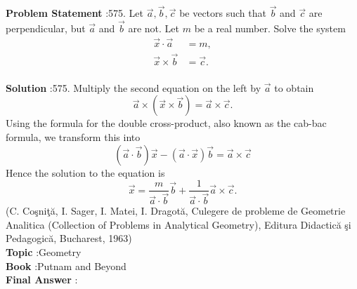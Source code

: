 \documentclass[10pt]{article}
\begin{document}
\textbf{Problem Statement} :575. Let $\vec{a}, \vec{b}, \vec{c}$ be vectors such that $\vec{b}$ and $\vec{c}$ are perpendicular, but $\vec{a}$ and $\vec{b}$ are not. Let $m$ be a real number. Solve the system$$ \begin{aligned} \vec{x} \cdot \vec{a} &=m, \\ \vec{x} \times \vec{b} &=\vec{c} . \end{aligned} $$\\
\textbf{Solution} :575. Multiply the second equation on the left by $\vec{a}$ to obtain$$ \vec{a} \times(\vec{x} \times \vec{b})=\vec{a} \times \vec{c} . $$Using the formula for the double cross-product, also known as the cab-bac formula, we transform this into$$ (\vec{a} \cdot \vec{b}) \vec{x}-(\vec{a} \cdot \vec{x}) \vec{b}=\vec{a} \times \vec{c} $$Hence the solution to the equation is$$ \vec{x}=\frac{m}{\vec{a} \cdot \vec{b}} \vec{b}+\frac{1}{\vec{a} \cdot \vec{b}} \vec{a} \times \vec{c} . $$(C. Coşniţă, I. Sager, I. Matei, I. Dragotă, Culegere de probleme de Geometrie Analitica (Collection of Problems in Analytical Geometry), Editura Didactică şi Pedagogică, Bucharest, 1963)\\
\textbf{Topic} :Geometry\\
\textbf{Book} :Putnam and Beyond\\
\textbf{Final Answer} :\\
\end{document}
